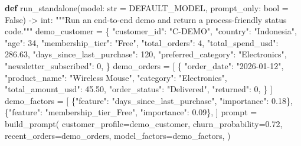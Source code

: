 \documentclass[
  indonesian,
  letterpaper,
  DIV=11,
  numbers=noendperiod]{scrreprt}
\newenvironment{Shaded}{\begin{snugshade}}{\end{snugshade}}
\newcommand{\BuiltInTok}[1]{\textcolor[rgb]{0.00,0.23,0.31}{#1}}
\newcommand{\CommentTok}[1]{\textcolor[rgb]{0.37,0.37,0.37}{#1}}
\newcommand{\DecValTok}[1]{\textcolor[rgb]{0.68,0.00,0.00}{#1}}
\newcommand{\FloatTok}[1]{\textcolor[rgb]{0.68,0.00,0.00}{#1}}
\newcommand{\KeywordTok}[1]{\textcolor[rgb]{0.00,0.23,0.31}{\textbf{#1}}}
\newcommand{\NormalTok}[1]{\textcolor[rgb]{0.00,0.23,0.31}{#1}}
\newcommand{\OperatorTok}[1]{\textcolor[rgb]{0.37,0.37,0.37}{#1}}
\newcommand{\StringTok}[1]{\textcolor[rgb]{0.13,0.47,0.30}{#1}}
\newcommand{\VariableTok}[1]{\textcolor[rgb]{0.07,0.07,0.07}{#1}}
\begin{document}
\begin{Shaded}
\begin{Highlighting}[]
\KeywordTok{def}\NormalTok{ run\_standalone(model: }\BuiltInTok{str} \OperatorTok{=}\NormalTok{ DEFAULT\_MODEL, prompt\_only: }\BuiltInTok{bool} \OperatorTok{=} \VariableTok{False}\NormalTok{) }\OperatorTok{{-}\textgreater{}} \BuiltInTok{int}\NormalTok{:}
    \CommentTok{"""Run an end{-}to{-}end demo and return a process{-}friendly status code."""}
\NormalTok{    demo\_customer }\OperatorTok{=}\NormalTok{ \{}
        \StringTok{"customer\_id"}\NormalTok{: }\StringTok{"C{-}DEMO"}\NormalTok{,}
        \StringTok{"country"}\NormalTok{: }\StringTok{"Indonesia"}\NormalTok{,}
        \StringTok{"age"}\NormalTok{: }\DecValTok{34}\NormalTok{,}
        \StringTok{"membership\_tier"}\NormalTok{: }\StringTok{"Free"}\NormalTok{,}
        \StringTok{"total\_orders"}\NormalTok{: }\DecValTok{4}\NormalTok{,}
        \StringTok{"total\_spend\_usd"}\NormalTok{: }\FloatTok{286.63}\NormalTok{,}
        \StringTok{"days\_since\_last\_purchase"}\NormalTok{: }\DecValTok{120}\NormalTok{,}
        \StringTok{"preferred\_category"}\NormalTok{: }\StringTok{"Electronics"}\NormalTok{,}
        \StringTok{"newsletter\_subscribed"}\NormalTok{: }\DecValTok{0}\NormalTok{,}
\NormalTok{    \}}
\NormalTok{    demo\_orders }\OperatorTok{=}\NormalTok{ [}
\NormalTok{        \{}
            \StringTok{"order\_date"}\NormalTok{: }\StringTok{"2026{-}01{-}12"}\NormalTok{,}
            \StringTok{"product\_name"}\NormalTok{: }\StringTok{"Wireless Mouse"}\NormalTok{,}
            \StringTok{"category"}\NormalTok{: }\StringTok{"Electronics"}\NormalTok{,}
            \StringTok{"total\_amount\_usd"}\NormalTok{: }\FloatTok{45.50}\NormalTok{,}
            \StringTok{"order\_status"}\NormalTok{: }\StringTok{"Delivered"}\NormalTok{,}
            \StringTok{"returned"}\NormalTok{: }\DecValTok{0}\NormalTok{,}
\NormalTok{        \}}
\NormalTok{    ]}
\NormalTok{    demo\_factors }\OperatorTok{=}\NormalTok{ [}
\NormalTok{        \{}\StringTok{"feature"}\NormalTok{: }\StringTok{"days\_since\_last\_purchase"}\NormalTok{, }\StringTok{"importance"}\NormalTok{: }\FloatTok{0.18}\NormalTok{\},}
\NormalTok{        \{}\StringTok{"feature"}\NormalTok{: }\StringTok{"membership\_tier\_Free"}\NormalTok{, }\StringTok{"importance"}\NormalTok{: }\FloatTok{0.09}\NormalTok{\},}
\NormalTok{    ]}
\NormalTok{    prompt }\OperatorTok{=}\NormalTok{ build\_prompt(}
\NormalTok{        customer\_profile}\OperatorTok{=}\NormalTok{demo\_customer,}
\NormalTok{        churn\_probability}\OperatorTok{=}\FloatTok{0.72}\NormalTok{,}
\NormalTok{        recent\_orders}\OperatorTok{=}\NormalTok{demo\_orders,}
\NormalTok{        model\_factors}\OperatorTok{=}\NormalTok{demo\_factors,}
\NormalTok{    )}


\end{Highlighting}
\end{Shaded}
\end{document}
